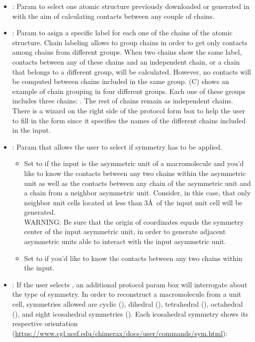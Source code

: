 \begin{itemize}
    \begin{itemize}
     \item {}: Param to select one atomic structure previously downloaded or generated in \scipion with the aim of calculating contacts between any couple of chains.
     \item {}: Param to asign a specific label for each one of the chains of the atomic structure. Chain labeling allows to group chains in order to get only contacts among chains from different groups. When two chains show the same label, contacts between any of these chains and an independent chain, or a chain that belongs to a different group, will be calculated. However, no contacts will be computed between chains included in the same group.  (C) shows an example of chain grouping in four different groups. Each one of these groups includes three chains: . The rest of chains remain as independent chains. There is a wizard on the right side of the  protocol form box to help the user to fill in the form since it specifies the names of the different chains included in the  input. 
     \item {}: Param that allows the user to select if symmetry has to be applied.
        \begin{itemize}
        \item Set to  if the  input is the asymmetric unit of a macromolecule and you'd like to know the contacts between any two chains within the asymmetric unit as well as the contacts between any chain of the asymmetric unit and a chain from a neighbor asymmetric unit. Consider, in this case, that only neighbor unit cells located at less than 3\AA\ of the input unit cell will be generated.\\
        WARNING: Be sure that the origin of coordinates equals the symmetry center of the input asymmetric unit, in order to generate adjacent asymmetric units able to interact with the input asymmetric unit.
        \item Set to  if you'd like to know the contacts between any two chains within the  input. 
        \end{itemize}
     \item {}: If the user selects , an additional protocol param box will interrogate about the type of symmetry. In order to reconstruct a macromolecule from a unit cell, symmetries allowed are cyclic (), dihedral (), tetrahedral (), octahedral (), and eight icosahedral symmetries (). Each icosahedral symmetry shows its respective \chimera orientation (\url{https://www.cgl.ucsf.edu/chimerax/docs/user/commands/sym.html}):

\end{itemize}
\end{itemize}
